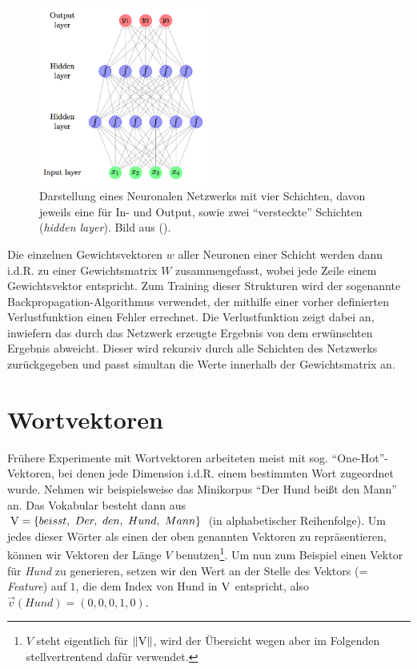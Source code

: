 \begin{figure}[h]
  \centering
  \includegraphics[width=0.5\textwidth]{../img/neuralnet.png}
  \caption[Darstellung eine Neuronalen Netzwerks]{Darstellung eines Neuronalen Netzwerks mit vier Schichten, davon jeweils eine
  für In- und Output, sowie zwei ``versteckte'' Schichten (\emph{hidden layer}). Bild aus (\cite{Goldberg15c}).\label{fig:neuralnet}}
\end{figure}

Die einzelnen Gewichtsvektoren $w$ aller Neuronen einer Schicht werden dann i.d.R. zu einer Gewichtsmatrix $W$ zusammengefasst,
wobei jede Zeile einem Gewichtsvektor entspricht. Zum Training dieser Strukturen wird der sogenannte Backpropagation-Algorithmus verwendet,
 der mithilfe einer vorher definierten Verlustfunktion einen Fehler errechnet. Die Verlustfunktion zeigt dabei an,
inwiefern das durch das Netzwerk erzeugte Ergebnis von dem erwünschten Ergebnis abweicht. Dieser wird rekursiv durch
alle Schichten des Netzwerks zurückgegeben und passt simultan die Werte innerhalb der Gewichtsmatrix an.

\section{Wortvektoren}\label{sec:wordvec}

Frühere Experimente mit Wortvektoren arbeiteten meist mit sog. ``One-Hot''-Vektoren, bei denen jede Dimension i.d.R.
einem bestimmten Wort zugeordnet wurde. Nehmen wir beispielsweise das Minikorpus ``Der Hund beißt den Mann'' an.
Das Vokabular besteht dann aus \\$\textsc{V} = \{bei{ss}t,\ Der,\ den,\ Hund,\ Mann\}$ (in alphabetischer Reihenfolge).
Um jedes dieser Wörter als einen der oben genannten Vektoren zu repräsentieren, können wir Vektoren der Länge $V$ benutzen\footnote{
$V$ steht eigentlich für $\|\textsc{V}\|$, wird der Übersicht wegen aber im Folgenden stellvertrentend dafür verwendet.}.
Um nun zum Beispiel einen Vektor für \emph{Hund} zu generieren, setzen wir den Wert an der Stelle des Vektors (=
\emph{Feature}) auf $1$, die dem Index von Hund in $\textsc{V}$ entspricht,
also $\vec{v}(Hund)=(0, 0, 0, 1, 0)$.\\


